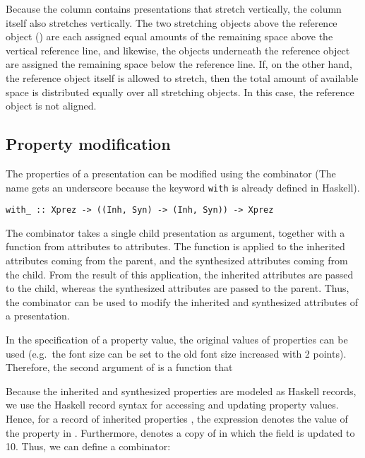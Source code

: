 Because the column contains presentations that stretch vertically, the column itself also stretches vertically. The two stretching objects above the reference object () are each assigned equal amounts of the remaining space above the vertical reference line, and likewise, the objects underneath the reference object are assigned the remaining space below the reference line. If, on the other hand, the reference object itself is allowed to stretch, then the total amount of available space is distributed equally over all stretching objects. In this case, the reference object is not aligned. 

%																
\subsection{Property modification}

The properties of a presentation can be modified using the  combinator (The name gets an underscore because the keyword {\tt with} is already defined in Haskell).

\begin{small}
\begin{verbatim}
with_ :: Xprez -> ((Inh, Syn) -> (Inh, Syn)) -> Xprez
\end{verbatim}
\end{small}

The combinator takes a single child presentation as argument, together with a function from attributes to attributes. The function is applied to the inherited attributes coming from the parent, and the synthesized attributes coming from the child. From the result of this application, the inherited attributes are passed to the child, whereas the synthesized attributes are passed to the parent. Thus, the  combinator can be used to modify the inherited and synthesized attributes of a presentation.

\bc \toHere
In the specification of a property value, the original values of properties can be used (e.g.\ the font size can be set to the old font size increased with 2 points). Therefore, the second argument of  is a function that %
\fromHere \ec

Because the inherited and synthesized properties are modeled as Haskell records, we use the Haskell record syntax for  accessing and updating property values. Hence, for a record of inherited properties , the expression  denotes the value of the  property in . Furthermore,  denotes a copy of  in which the  field is updated to 10. Thus, we can define a   combinator: 

